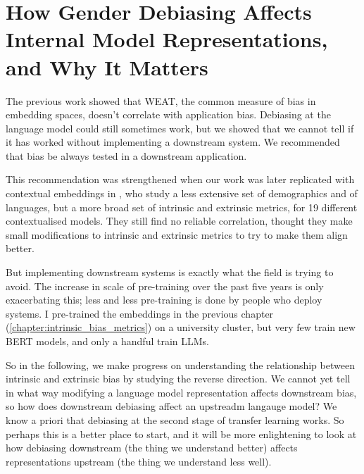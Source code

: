 \chapter{How Gender Debiasing Affects Internal Model Representations,
and Why It Matters}\label{chapter:gender_bias_probing}

The previous work showed that WEAT, the common measure of bias in embedding spaces, doesn't correlate with application bias. Debiasing at the language model could still sometimes work, but we showed that we cannot tell if it has worked without implementing a downstream system. We recommended that bias be always tested in a downstream application. 

This recommendation was strengthened when our work was later replicated with contextual embeddings in \citet{cao-etal-2022-intrinsic}, who study a less extensive set of demographics and of languages, but a more broad set of intrinsic and extrinsic metrics, for 19 different contextualised models. They still find no reliable correlation, thought they make small modifications to intrinsic and extrinsic metrics to try to make them align better. 

But implementing downstream systems is exactly what the field is trying to avoid. The increase in scale of pre-training over the past five years is only exacerbating this; less and less pre-training is done by people who deploy systems. I pre-trained the embeddings in the previous chapter (\ref{chapter:intrinsic_bias_metrics}) on a university cluster, but very few train new BERT models, and only a handful train LLMs.

So in the following, we make progress on understanding the relationship between intrinsic and extrinsic bias by studying the reverse direction. We cannot yet tell in what way modifying a language model representation affects downstream bias, so how does downstream debiasing affect an upstreadm langauge model? We know a priori that debiasing at the second stage of transfer learning works. 
So perhaps this is a better place to start, and it will be more enlightening to look at how debiasing downstream (the thing we understand better) affects representations upstream (the thing we understand less well). 

